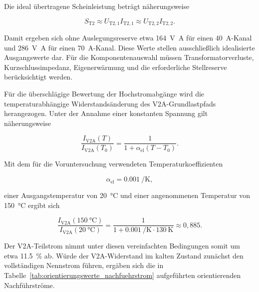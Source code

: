 Die ideal übertragene Scheinleistung beträgt näherungsweise

\begin{equation}
    S_{\mathrm{T2}}
    \approx
    U_{\mathrm{T2},1} I_{\mathrm{T2},1}
    \approx
    U_{\mathrm{T2},2} I_{\mathrm{T2},2}.
    \label{eq:scheinleistung_trafo2}
\end{equation}

Damit ergeben sich ohne Auslegungsreserve etwa
\SI{164}{\volt\ampere} für einen \SI{40}{\ampere}-Kanal und
\SI{286}{\volt\ampere} für einen \SI{70}{\ampere}-Kanal. Diese Werte
stellen ausschließlich idealisierte Ausgangswerte dar. Für die
Komponentenauswahl müssen Transformatorverluste,
Kurzschlussimpedanz, Eigenerwärmung und die erforderliche
Stellreserve berücksichtigt werden.

Für die überschlägige Bewertung der Hochstromabgänge wird die
temperaturabhängige Widerstandsänderung des V2A-Grundlastpfads
herangezogen. Unter der Annahme einer konstanten Spannung gilt
näherungsweise

\begin{equation}
    \frac{I_{\mathrm{V2A}}(T)}
         {I_{\mathrm{V2A}}(T_0)}
    =
    \frac{1}
    {1+\alpha_{\mathrm{el}}(T-T_0)}.
    \label{eq:stromverhaeltnis_v2a_vorbemessung}
\end{equation}

Mit dem für die Voruntersuchung verwendeten Temperaturkoeffizienten

\begin{equation}
    \alpha_{\mathrm{el}}
    =
    \SI{0.001}{\per\kelvin},
\end{equation}

einer Ausgangstemperatur von \SI{20}{\degreeCelsius} und einer
angenommenen Temperatur von \SI{150}{\degreeCelsius} ergibt sich

\begin{equation}
    \frac{I_{\mathrm{V2A}}(\SI{150}{\degreeCelsius})}
         {I_{\mathrm{V2A}}(\SI{20}{\degreeCelsius})}
    =
    \frac{1}
    {1+\SI{0.001}{\per\kelvin}\cdot\SI{130}{\kelvin}}
    \approx
    0{,}885.
    \label{eq:stromverhaeltnis_v2a_150c}
\end{equation}

Der V2A-Teilstrom nimmt unter diesen vereinfachten Bedingungen somit
um etwa \SI{11.5}{\percent} ab. Würde der V2A-Widerstand im kalten
Zustand zunächst den vollständigen Nennstrom führen, ergäben sich die
in Tabelle~\ref{tab:orientierungswerte_nachfuehrstrom}
aufgeführten orientierenden Nachführströme.

